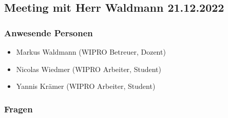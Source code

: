 \documentclass[a4paper, table]{article}
\begin{document}
\newpage
\subsection{Meeting mit Herr Waldmann 21.12.2022}

\subsubsection*{Anwesende Personen}

\begin{itemize}
    \item Markus Waldmann (WIPRO Betreuer, Dozent)
    \item Nicolas Wiedmer (WIPRO Arbeiter, Student)
    \item Yannis Krämer (WIPRO Arbeiter, Student)
\end{itemize}

\subsubsection*{Fragen}
\end{document}
